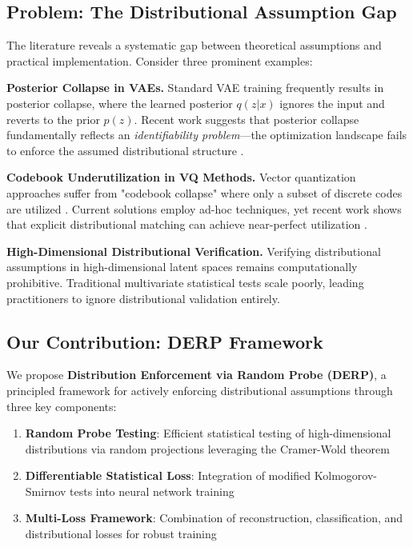 \documentclass{article}
\begin{document}
\subsection{Problem: The Distributional Assumption Gap}

The literature reveals a systematic gap between theoretical assumptions and practical implementation. Consider three prominent examples:

\textbf{Posterior Collapse in VAEs.} Standard VAE training frequently results in posterior collapse, where the learned posterior $q(z|x)$ ignores the input and reverts to the prior $p(z)$. Recent work suggests that posterior collapse fundamentally reflects an \emph{identifiability problem}—the optimization landscape fails to enforce the assumed distributional structure \citep{lucas2019don, wang2023posterior}.

\textbf{Codebook Underutilization in VQ Methods.} Vector quantization approaches suffer from "codebook collapse" where only a subset of discrete codes are utilized \citep{van2017neural}. Current solutions employ ad-hoc techniques, yet recent work shows that explicit distributional matching can achieve near-perfect utilization \citep{fang_2025_vq_wasserstein}.

\textbf{High-Dimensional Distributional Verification.} Verifying distributional assumptions in high-dimensional latent spaces remains computationally prohibitive. Traditional multivariate statistical tests scale poorly, leading practitioners to ignore distributional validation entirely.

\subsection{Our Contribution: DERP Framework}

We propose \textbf{Distribution Enforcement via Random Probe (DERP)}, a principled framework for actively enforcing distributional assumptions through three key components:

\begin{enumerate}
\item \textbf{Random Probe Testing}: Efficient statistical testing of high-dimensional distributions via random projections leveraging the Cramer-Wold theorem
\item \textbf{Differentiable Statistical Loss}: Integration of modified Kolmogorov-Smirnov tests into neural network training
\item \textbf{Multi-Loss Framework}: Combination of reconstruction, classification, and distributional losses for robust training
\end{enumerate}
\end{document}
